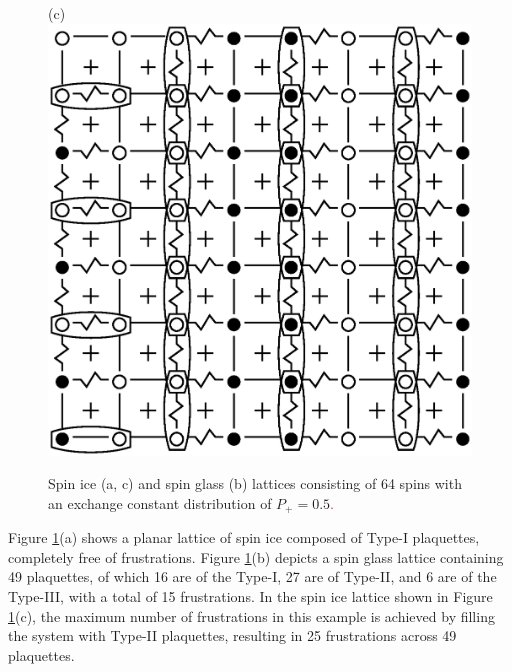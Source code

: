 \documentclass[preprint,12pt]{elsarticle}
\begin{document}
\begin{figure}[H]
\begin{minipage}[h]{0.3\linewidth}
		\end{minipage}
		\hfill
		\begin{minipage}[h]{0.3\linewidth}
			\centering(c)
			\includegraphics[width=1\linewidth]{pictures/SI_64_J0}
		\end{minipage}
		\hfill
		\caption{Spin ice (a, c) and spin glass (b) lattices consisting of 64 spins with an exchange constant distribution of $P_+ = 0.5$\textcolor{red}{.}}
		\label{fig:cell_SI_SG_64}
		
	\end{figure}
	
	
	Figure \ref{fig:cell_SI_SG_64}(a) shows a planar lattice of spin ice composed of Type-I plaquettes, completely free of frustrations.
	Figure \ref{fig:cell_SI_SG_64}(b) depicts a spin glass lattice containing 49 plaquettes, of which 16 are of the Type-I, 27 are of Type-II, and 6 are of the Type-III, with a total of 15 frustrations.
	In the spin ice lattice shown in Figure \ref{fig:cell_SI_SG_64}(c), the maximum number of frustrations in this example is achieved by filling the system with Type-II plaquettes, resulting in 25 frustrations across 49 plaquettes.
	
\end{document}
